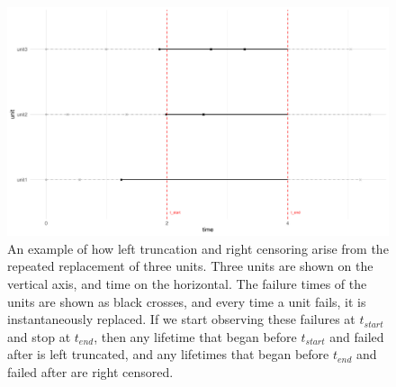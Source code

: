 \begin{figure}[h]
    \centering
    \includegraphics[width=1\textwidth]{./figures/ch-2/left_truncation_w_right_censoring_example.pdf}
    \caption{An example of how left truncation and right censoring arise from the repeated replacement of three units. Three units are shown on the vertical axis, and time on the horizontal. The failure times of the units are shown as black crosses, and every time a unit fails, it is instantaneously replaced. If we start observing these failures at $t_{start}$ and stop at $t_{end}$, then any lifetime that began before $t_{start}$ and failed after is left truncated, and any lifetimes that began before $t_{end}$ and failed after are right censored.}
    \label{fig:left_trunc_and_right_cens_example}
\end{figure}

